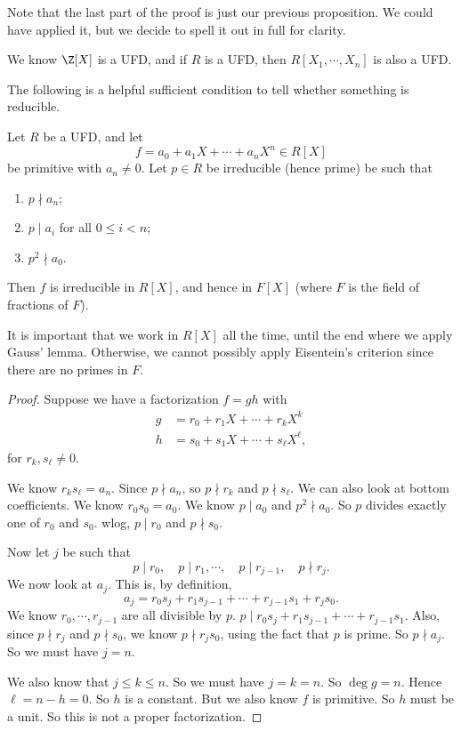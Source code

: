 \documentclass[a4paper]{article}
\begin{document}
Note that the last part of the proof is just our previous proposition. We could have applied it, but we decide to spell it out in full for clarity.

\begin{eg}
  We know $\Z[X]$ is a UFD, and if $R$ is a UFD, then $R[X_1, \cdots, X_n]$ is also a UFD.
\end{eg}

The following is a helpful sufficient condition to tell whether something is reducible.
\begin{prop}
  Let $R$ be a UFD, and let
  \[
    f = a_0 + a_1 X + \cdots + a_n X^n \in R[X]
  \]
  be primitive with $a_n \not= 0$. Let $p \in R$ be irreducible (hence prime) be such that
  \begin{enumerate}
    \item $p \nmid a_n$;
    \item $p \mid a_i$ for all $0 \leq i < n$;
    \item $p^2 \nmid a_0$.
  \end{enumerate}
  Then $f$ is irreducible in $R[X]$, and hence in $F[X]$ (where $F$ is the field of fractions of $F$).
\end{prop}
It is important that we work in $R[X]$ all the time, until the end where we apply Gauss' lemma. Otherwise, we cannot possibly apply Eisentein's criterion since there are no primes in $F$.

\begin{proof}
  Suppose we have a factorization $f = gh$ with
  \begin{align*}
    g &= r_0 + r_1 X + \cdots + r_k X^k\\
    h &= s_0 + s_1 X + \cdots + s_\ell X^\ell,
  \end{align*}
  for $r_k, s_\ell \not= 0$.

  We know $r_k s_\ell = a_n$. Since $p \nmid a_n$, so $p \nmid r_k$ and $p \nmid s_\ell$. We can also look at bottom coefficients. We know $r_0 s_0 = a_0$. We know $p \mid a_0$ and $p^2 \nmid a_0$. So $p$ divides exactly one of $r_0$ and $s_0$. wlog, $p \mid r_0$ and $p \nmid s_0$.

  Now let $j$ be such that
  \[
    p \mid r_0,\quad p \mid r_1,\cdots,\quad p \mid r_{j - 1},\quad p \nmid r_j.
  \]
  We now look at $a_j$. This is, by definition,
  \[
    a_j = r_0 s_j + r_1 s_{j - 1} + \cdots + r_{j - 1} s_1 + r_j s_0.
  \]
  We know $r_0, \cdots, r_{j - 1}$ are all divisible by $p$. $p \mid r_0 s_j + r_1 s_{j - 1} + \cdots + r_{j - 1} s_1$. Also, since $p \nmid r_j$ and $p \nmid s_0$, we know $p \nmid r_j s_0$, using the fact that $p$ is prime. So $p \nmid a_j$. So we must have $j = n$.

  We also know that $j \leq k \leq n$. So we must have $j = k = n$. So $\deg g = n$. Hence $\ell = n - h = 0$. So $h$ is a constant. But we also know $f$ is primitive. So $h$ must be a unit. So this is not a proper factorization.
\end{proof}
\end{document}
